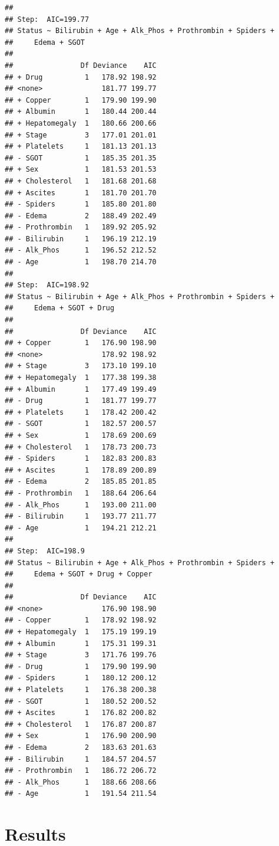 \documentclass[
]{article}
\begin{document}
\begin{verbatim}
## 
## Step:  AIC=199.77
## Status ~ Bilirubin + Age + Alk_Phos + Prothrombin + Spiders + 
##     Edema + SGOT
## 
##                Df Deviance    AIC
## + Drug          1   178.92 198.92
## <none>              181.77 199.77
## + Copper        1   179.90 199.90
## + Albumin       1   180.44 200.44
## + Hepatomegaly  1   180.66 200.66
## + Stage         3   177.01 201.01
## + Platelets     1   181.13 201.13
## - SGOT          1   185.35 201.35
## + Sex           1   181.53 201.53
## + Cholesterol   1   181.68 201.68
## + Ascites       1   181.70 201.70
## - Spiders       1   185.80 201.80
## - Edema         2   188.49 202.49
## - Prothrombin   1   189.92 205.92
## - Bilirubin     1   196.19 212.19
## - Alk_Phos      1   196.52 212.52
## - Age           1   198.70 214.70
## 
## Step:  AIC=198.92
## Status ~ Bilirubin + Age + Alk_Phos + Prothrombin + Spiders + 
##     Edema + SGOT + Drug
## 
##                Df Deviance    AIC
## + Copper        1   176.90 198.90
## <none>              178.92 198.92
## + Stage         3   173.10 199.10
## + Hepatomegaly  1   177.38 199.38
## + Albumin       1   177.49 199.49
## - Drug          1   181.77 199.77
## + Platelets     1   178.42 200.42
## - SGOT          1   182.57 200.57
## + Sex           1   178.69 200.69
## + Cholesterol   1   178.73 200.73
## - Spiders       1   182.83 200.83
## + Ascites       1   178.89 200.89
## - Edema         2   185.85 201.85
## - Prothrombin   1   188.64 206.64
## - Alk_Phos      1   193.00 211.00
## - Bilirubin     1   193.77 211.77
## - Age           1   194.21 212.21
## 
## Step:  AIC=198.9
## Status ~ Bilirubin + Age + Alk_Phos + Prothrombin + Spiders + 
##     Edema + SGOT + Drug + Copper
## 
##                Df Deviance    AIC
## <none>              176.90 198.90
## - Copper        1   178.92 198.92
## + Hepatomegaly  1   175.19 199.19
## + Albumin       1   175.31 199.31
## + Stage         3   171.76 199.76
## - Drug          1   179.90 199.90
## - Spiders       1   180.12 200.12
## + Platelets     1   176.38 200.38
## - SGOT          1   180.52 200.52
## + Ascites       1   176.82 200.82
## + Cholesterol   1   176.87 200.87
## + Sex           1   176.90 200.90
## - Edema         2   183.63 201.63
## - Bilirubin     1   184.57 204.57
## - Prothrombin   1   186.72 206.72
## - Alk_Phos      1   188.66 208.66
## - Age           1   191.54 211.54
\end{verbatim}

\hypertarget{results}{%
\section{Results}\label{results}}
\end{document}
